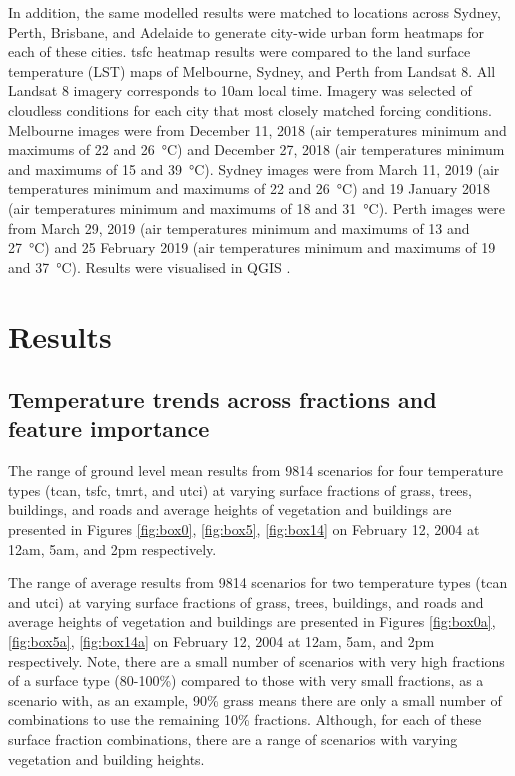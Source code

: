 \documentclass[final,3p,times,authoryear]{elsarticle}
\begin{document}
In addition, the same modelled results were matched to locations across Sydney, Perth, Brisbane, and Adelaide to generate city-wide urban form heatmaps for each of these cities.  \gls{tsfc} heatmap results were compared to the land surface temperature (LST) maps of Melbourne, Sydney, and Perth from Landsat 8. All Landsat 8 imagery corresponds to 10am local time. Imagery was selected of cloudless conditions for each city that most closely matched forcing conditions. Melbourne images were from December 11, 2018  (air temperatures minimum and maximums of 22 and 26\SI{}{\degreeCelsius}) and December 27, 2018  (air temperatures minimum and maximums of 15 and 39\SI{}{\degreeCelsius}). Sydney images were from March 11, 2019  (air temperatures minimum and maximums of 22 and 26\SI{}{\degreeCelsius}) and 19 January 2018  (air temperatures minimum and maximums of 18 and 31\SI{}{\degreeCelsius}). Perth images were from March 29, 2019  (air temperatures minimum and maximums of 13 and 27\SI{}{\degreeCelsius}) and 25 February 2019  (air temperatures minimum and maximums of 19 and 37\SI{}{\degreeCelsius}). Results were visualised in QGIS \citep{QGIS2009}.


\section{Results}\label{sec:results}

\subsection{Temperature trends across fractions and feature importance}\label{sec:resulttrends}

The range of ground level mean results from 9814 scenarios for four temperature types (\gls{tcan}, \gls{tsfc}, \gls{tmrt}, and \gls{utci}) at varying surface fractions of grass, trees, buildings, and roads and average heights of vegetation and buildings are presented in Figures \ref{fig:box0}, \ref{fig:box5}, \ref{fig:box14} on February 12, 2004 at 12am, 5am, and 2pm respectively.



The range of average results from 9814 scenarios for two temperature types (\gls{tcan} and \gls{utci}) at varying surface fractions of grass, trees, buildings, and roads and average heights of vegetation and buildings are presented in Figures \ref{fig:box0a}, \ref{fig:box5a}, \ref{fig:box14a} on February 12, 2004 at 12am, 5am, and 2pm respectively. Note, there are a small number of scenarios with very high fractions of a surface type (80-100\%) compared to those with very small fractions, as a scenario with, as an example, 90\% grass means there are only a small number of combinations to use the remaining 10\% fractions. Although, for each of these surface fraction combinations, there are a range of scenarios with varying vegetation and building heights.
\end{document}
